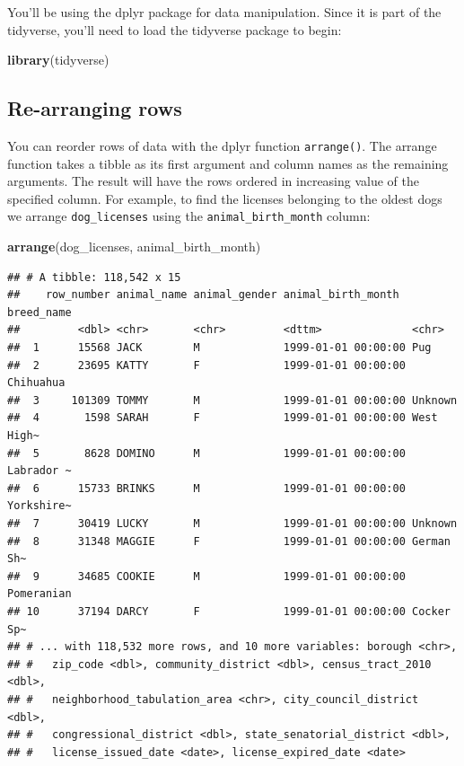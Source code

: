 \documentclass[]{Nemilov}
\newenvironment{Shaded}{\begin{snugshade}}{\end{snugshade}}
\newcommand{\KeywordTok}[1]{\textcolor[rgb]{0.13,0.29,0.53}{\textbf{#1}}}
\newcommand{\NormalTok}[1]{#1}
\begin{document}
You'll be using the dplyr package for data manipulation. Since it is part of the tidyverse, you'll need to load the tidyverse package to begin:

\begin{Shaded}
\begin{Highlighting}[]
\KeywordTok{library}\NormalTok{(tidyverse)}
\end{Highlighting}
\end{Shaded}

\hypertarget{re-arranging-rows}{%
\subsection{Re-arranging rows}\label{re-arranging-rows}}

You can reorder rows of data with the dplyr function \texttt{arrange()}. The arrange function takes a tibble as its first argument and column names as the remaining arguments. The result will have the rows ordered in increasing value of the specified column. For example, to find the licenses belonging to the oldest dogs we arrange \texttt{dog\_licenses} using the \texttt{animal\_birth\_month} column:

\begin{Shaded}
\begin{Highlighting}[]
\KeywordTok{arrange}\NormalTok{(dog_licenses, animal_birth_month)}
\end{Highlighting}
\end{Shaded}

\begin{verbatim}
## # A tibble: 118,542 x 15
##    row_number animal_name animal_gender animal_birth_month  breed_name
##         <dbl> <chr>       <chr>         <dttm>              <chr>     
##  1      15568 JACK        M             1999-01-01 00:00:00 Pug       
##  2      23695 KATTY       F             1999-01-01 00:00:00 Chihuahua 
##  3     101309 TOMMY       M             1999-01-01 00:00:00 Unknown   
##  4       1598 SARAH       F             1999-01-01 00:00:00 West High~
##  5       8628 DOMINO      M             1999-01-01 00:00:00 Labrador ~
##  6      15733 BRINKS      M             1999-01-01 00:00:00 Yorkshire~
##  7      30419 LUCKY       M             1999-01-01 00:00:00 Unknown   
##  8      31348 MAGGIE      F             1999-01-01 00:00:00 German Sh~
##  9      34685 COOKIE      M             1999-01-01 00:00:00 Pomeranian
## 10      37194 DARCY       F             1999-01-01 00:00:00 Cocker Sp~
## # ... with 118,532 more rows, and 10 more variables: borough <chr>,
## #   zip_code <dbl>, community_district <dbl>, census_tract_2010 <dbl>,
## #   neighborhood_tabulation_area <chr>, city_council_district <dbl>,
## #   congressional_district <dbl>, state_senatorial_district <dbl>,
## #   license_issued_date <date>, license_expired_date <date>
\end{verbatim}
\end{document}
